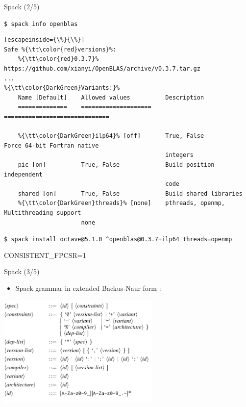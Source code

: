 \documentclass[xcolor=svgnames,xcolor=table,aspectratio=169]{beamer}
\begin{document}
\begin{frame}[fragile]{Spack (2/5)}

\texttt{{\color{blue}\$ spack info} openblas}

\begin{lstlisting}[escapeinside={\%}{\%}]
Safe %{\tt\color{red}versions}%:
    %{\tt\color{red}0.3.7}%      https://github.com/xianyi/OpenBLAS/archive/v0.3.7.tar.gz
...
%{\tt\color{DarkGreen}Variants:}%
    Name [Default]    Allowed values          Description
    ==============    ====================    ==============================

    %{\tt\color{DarkGreen}ilp64}% [off]       True, False             Force 64-bit Fortran native
                                              integers
    pic [on]          True, False             Build position independent
                                              code
    shared [on]       True, False             Build shared libraries
    %{\tt\color{DarkGreen}threads}% [none]    pthreads, openmp,       Multithreading support
                      none
\end{lstlisting}

\texttt{{\color{blue}\$ spack install}
octave{\color{red}@5.1.0}
\^{}openblas{\color{red}@0.3.7}{\color{DarkGreen}+ilp64 threads=openmp}}

\hfill{\color{DarkGreen}CONSISTENT\_FPCSR=1}
\end{frame}



\begin{frame}{Spack (3/5)}
\begin{itemize}
\item
Spack grammar in extended Backus-Naur form \cite{Gamblin2015}:
\end{itemize}
\begin{center}
\includegraphics[width=0.6\textwidth]{res/spack-grammar}
\end{center}
\end{frame}
\end{document}
